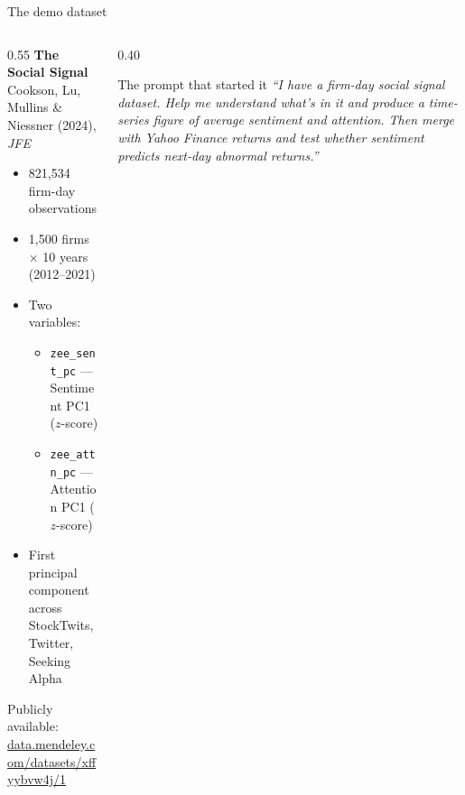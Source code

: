 \documentclass[aspectratio=169, 10pt]{beamer}
\begin{document}
\begin{frame}{The demo dataset}
  \begin{columns}[T]
    \begin{column}{0.55\textwidth}
      \textbf{The Social Signal}\\
      Cookson, Lu, Mullins \& Niessner (2024), \textit{JFE}\\[0.4em]
      \small
      \begin{itemize}
        \item 821,534 firm-day observations
        \item 1,500 firms $\times$ 10 years (2012--2021)
        \item Two variables:
          \begin{itemize}
            \item \texttt{zee\_sent\_pc} --- Sentiment PC1 ($z$-score)
            \item \texttt{zee\_attn\_pc} --- Attention PC1 ($z$-score)
          \end{itemize}
        \item First principal component across StockTwits, Twitter, Seeking Alpha
      \end{itemize}
      \vspace{0.4em}
      Publicly available:\\
      \href{https://data.mendeley.com/datasets/xffyybvw4j/1}{\small data.mendeley.com/datasets/xffyybvw4j/1}
    \end{column}
    \begin{column}{0.40\textwidth}
      \begin{block}{The prompt that started it}
        \footnotesize\itshape
        ``I have a firm-day social signal dataset. Help me understand
        what's in it and produce a time-series figure of average sentiment
        and attention. Then merge with Yahoo Finance returns and test whether
        sentiment predicts next-day abnormal returns.''
      \end{block}
    \end{column}
  \end{columns}
\end{frame}
\end{document}

